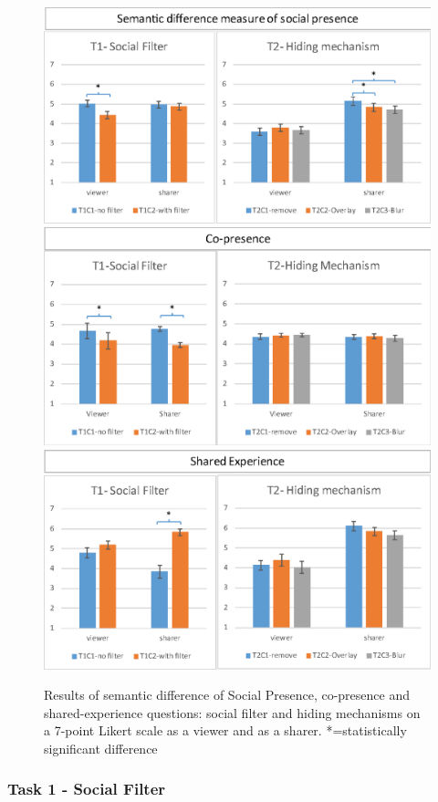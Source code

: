 \begin{figure}
    \begin{center}
    \includegraphics[width=.8\linewidth]{images/54-hiding-frontier18/images-17.eps}
    \includegraphics[width=.8\linewidth]{images/54-hiding-frontier18/images-16.eps}
    \includegraphics[width=.8\linewidth]{images/54-hiding-frontier18/images-18.eps}
    \caption{Results of semantic difference of Social Presence, co-presence and shared-experience questions: social filter and hiding mechanisms on a 7-point Likert scale as a viewer and as a sharer. *=statistically significant difference}
    \label{fig:frontier18:result}
    \end{center}
\end{figure}


\subsubsection{Task 1 - Social Filter}

